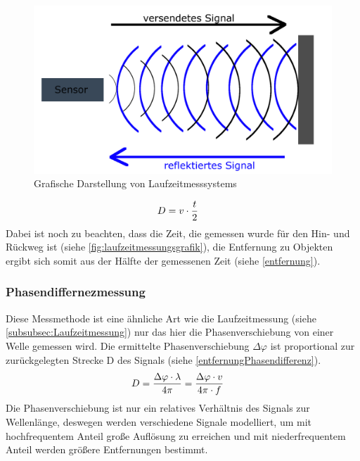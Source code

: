 \begin{figure}[H]
 \centering
 \includegraphics[width=\linewidth]{Bilder/Grundlagen/LaufzeitmessungGrafik.png}
 \caption{Grafische Darstellung von Laufzeitmesssystems}
 \label{fig:laufzeitmessungsgrafik}
\end{figure}

\begin{align}
\centering
D &= v \cdot \dfrac{t}{2} \label{entfernung}
\end{align}
Dabei ist noch zu beachten, dass die Zeit, die gemessen wurde für den Hin- und Rückweg ist (siehe \autoref{fig:laufzeitmessungsgrafik}), die Entfernung zu Objekten ergibt sich somit aus der Hälfte der gemessenen Zeit (siehe \autoref{entfernung}).\cite[S.36f]{RobotikSichtInformatik.2012}

\subsubsection{Phasendiffernezmessung}
Diese Messmethode ist eine ähnliche Art wie die Laufzeitmessung (siehe \autoref{subsubsec:Laufzeitmessung}) nur das hier die Phasenverschiebung von einer Welle gemessen wird. Die ermittelte Phasenverschiebung $\Delta\varphi$ ist proportional zur zurückgelegten Strecke D des Signals (siehe \autoref{entfernungPhasendifferenz}). 
\begin{align}
\centering
D &= \dfrac{\Delta\varphi \cdot \lambda }{4\pi} \label{entfernungPhasendifferenz} = \dfrac{\Delta\varphi \cdot v }{4\pi \cdot f}
\end{align}
Die Phasenverschiebung ist nur ein relatives Verhältnis des Signals zur Wellenlänge, deswegen werden verschiedene Signale modelliert, um mit hochfrequentem Anteil große Auflösung zu erreichen und mit niederfrequentem Anteil werden größere Entfernungen bestimmt. \cite[S.37f]{RobotikSichtInformatik.2012}

